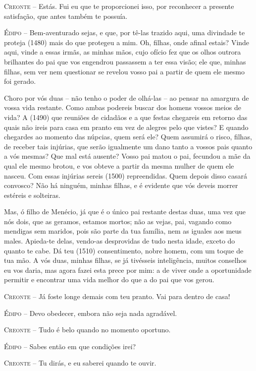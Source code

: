 \textsc{Creonte} --   Estás. Fui eu que te proporcionei isso, por reconhecer a presente
satisfação, que antes também te possuía.

\textsc{Édipo} --   Bem-aventurado sejas, e que, por tê-las trazido aqui, uma divindade te
proteja (1480) mais do que protegeu a mim. Oh, filhas, onde afinal
estais? Vinde aqui, vinde a essas irmãs, as minhas mãos, cujo ofício fez
que os olhos outrora brilhantes do pai que vos engendrou passassem a ter
essa visão; ele que, minhas filhas, sem ver nem questionar se revelou
vosso pai a partir de quem ele mesmo foi gerado.

Choro por vós duas -- não tenho o poder de olhá-las -- ao pensar na
amargura de vossa vida restante. Como ambas podereis buscar dos homens
vossos meios de vida? A (1490) que reuniões de cidadãos e a que festas
chegareis em retorno das quais não ireis para casa em pranto em vez de
alegres pelo que vistes? E quando chegardes ao momento das núpcias, quem
será ele? Quem assumirá o risco, filhas, de receber tais injúrias, que
serão igualmente um dano tanto a vossos pais quanto a vós mesmas? Que
mal está ausente? Vosso pai matou o pai, fecundou a mãe da qual ele
mesmo brotou, e vos obteve a partir da mesma mulher de quem ele nasceu.
Com essas injúrias sereis (1500) repreendidas. Quem depois disso casará
convosco? Não há ninguém, minhas filhas, e é evidente que vós deveis
morrer estéreis e solteiras.

Mas, ó filho de Menécio, já que é o único pai restante destas duas, uma
vez que nós dois, que as geramos, estamos mortos; não as vejas, pai,
vagando como mendigas sem maridos, pois são parte da tua família, nem as
iguales aos meus males. Apieda-te delas, vendo-as desprovidas de tudo
nesta idade, exceto do quanto te cabe. Dá teu (1510) consentimento,
nobre homem, com um toque de tua mão. A vós duas, minhas filhas, se já
tivésseis inteligência, muitos conselhos eu vos daria, mas agora fazei
esta prece por mim: a de viver onde a oportunidade permitir e encontrar
uma vida melhor do que a do pai que vos gerou.

\textsc{Creonte} --   Já foste longe demais com teu pranto. Vai para dentro de casa!

\textsc{Édipo} --   Devo obedecer, embora não seja nada agradável.

\textsc{Creonte} --   Tudo é belo quando no momento oportuno.

\textsc{Édipo} --   Sabes então em que condições irei?

\textsc{Creonte} --   Tu dirás, e eu saberei quando te ouvir.


